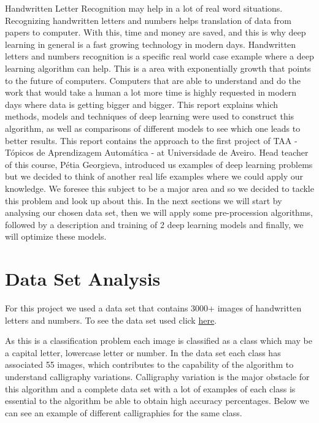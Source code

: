 \documentclass[conference]{IEEEtran}
\newcommand\tab[1][0.4cm]{\hspace*{#1}}
\begin{document}
Handwritten Letter Recognition may help in a lot of real word situations. Recognizing handwritten letters and numbers helps translation of data from papers to computer. With this, time and money are saved, and this is why deep learning in general is a fast growing technology in modern days. Handwritten letters and numbers recognition is a specific real world case example where a deep learning algorithm can help. This is a area with exponentially growth that points to the future of computers. Computers that are able to understand and do the work that would take a human a lot more time is highly requested in modern days where data is getting bigger and bigger. This report explains which methods, models and techniques of deep learning were used to construct this algorithm, as well as comparisons of different models to see which one leads to better results.
\linebreak
\tab This report contains the approach to the first project of TAA - Tópicos de Aprendizagem Automática - at Universidade de Aveiro. Head teacher of this course, Pétia Georgieva, introduced us examples of deep learning problems but we decided to think of another real life examples where we could apply our knowledge. We foresee this subject to be a major area and so we decided to tackle this problem and look up about this.
\linebreak
\tab In the next sections we will start by analysing our chosen data set, then we will apply some pre-procession algorithms, followed by a description and training of 2 deep learning models and finally, we will optimize these models.


\section{Data Set Analysis}
For this project we used a data set that contains 3000+ images of handwritten letters and numbers. To see the data set used click  \href{https://www.kaggle.com/dhruvildave/english-handwritten-characters-dataset}{here}.

As this is a classification problem each image is classified as a class which may be a capital letter, lowercase letter or number. In the data set each class has associated 55 images, which contributes to the capability of the algorithm to understand calligraphy variations. Calligraphy variation is the major obstacle for this algorithm and a complete data set with a lot of examples of each class is essential to the algorithm be able to obtain high accuracy percentages. Below we can see an example of different calligraphies for the same class.
\end{document}
